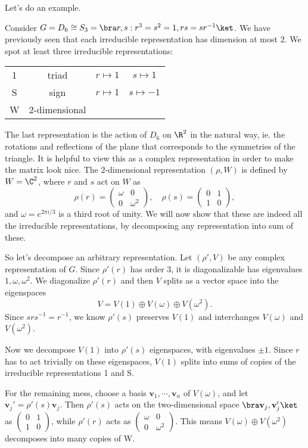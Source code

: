 \documentclass[a4paper]{article}
\begin{document}
Let's do an example.
\begin{eg}
  Consider $G = D_6 \cong S_3 = \bra r, s: r^3 = s^2 = 1, rs = sr^{-1}\ket$. We have previously seen that each irreducible representation has dimension at most $2$. We spot at least three irreducible representations:
  \begin{center}
    \begin{tabular}{cccc}
      1 & triad & $r \mapsto 1$ & $s \mapsto 1$\\
      S & sign & $r \mapsto 1$ & $s \mapsto -1$\\
      W & $2$-dimensional &
    \end{tabular}
  \end{center}
  The last representation is the action of $D_6$ on $\R^2$ in the natural way, ie. the rotations and reflections of the plane that corresponds to the symmetries of the triangle. It is helpful to view this as a complex representation in order to make the matrix look nice. The $2$-dimensional representation $(\rho, W)$ is defined by $W = \C^2$, where $r$ and $s$ act on $W$ as
  \[
    \rho(r) =
    \begin{pmatrix}
      \omega & 0\\
      0 & \omega^2
    \end{pmatrix},\quad
    \rho(s) =
    \begin{pmatrix}
      0 & 1\\
      1 & 0
    \end{pmatrix},
  \]
  and $\omega = e^{2\pi i/3}$ is a third root of unity. We will now show that these are indeed all the irreducible representations, by decomposing any representation into sum of these.

  So let's decompose an arbitrary representation. Let $(\rho', V)$ be any complex representation of $G$. Since $\rho'(r)$ has order $3$, it is diagonalizable has eigenvalues $1, \omega, \omega^2$. We diagonalize $\rho'(r)$ and then $V$ splits as a vector space into the eigenspaces
  \[
    V = V(1) \oplus V(\omega) \oplus V(\omega^2).
  \]
  Since $srs^{-1}= r^{-1}$, we know $\rho'(s)$ preserves $V(1)$ and interchanges $V(\omega)$ and $V(\omega^2)$.

  Now we decompose $V(1)$ into $\rho'(s)$ eigenspaces, with eigenvalues $\pm1$. Since $r$ has to act trivially on these eigenspaces, $V(1)$ splits into sums of copies of the irreducible representations 1 and S.

  For the remaining mess, choose a basis $\mathbf{v}_1, \cdots, \mathbf{v}_n$ of $V(\omega)$, and let $\mathbf{v}_j' = \rho'(s) \mathbf{v}_j$. Then $\rho'(s)$ acts on the two-dimensional space $\bra \mathbf{v}_j, \mathbf{v}_j'\ket$ as $\begin{pmatrix}0 & 1\\1 & 0\end{pmatrix}$, while $\rho'(r)$ acts as $\begin{pmatrix} \omega & 0\\0 & \omega^2\end{pmatrix}$. This means $V(\omega) \oplus V(\omega^2)$ decomposes into many copies of W.
\end{eg}
\end{document}
